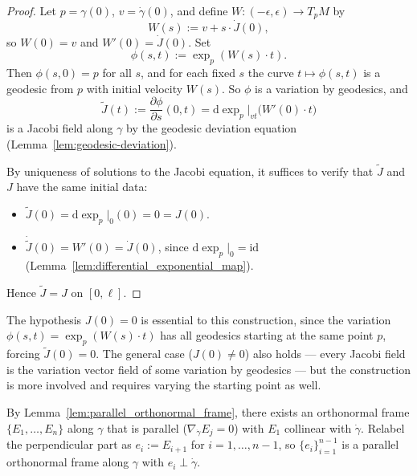 \begin{proof}
Let $p = \gamma(0)$, $v = \dot\gamma(0)$, and define $W : (-\epsilon, \epsilon) \to T_p M$ by
\[
W(s) := v + s \cdot \dot J(0),
\]
so $W(0) = v$ and $W'(0) = \dot J(0)$. Set
\[
\phi(s, t) := \exp_p(W(s) \cdot t).
\]
Then $\phi(s, 0) = p$ for all $s$, and for each fixed $s$ the curve $t \mapsto \phi(s, t)$ is a geodesic from $p$ with initial velocity $W(s)$. So $\phi$ is a variation by geodesics, and 
\[
\widetilde J(t) := \frac{\partial \phi}{\partial s}(0, t) = \mathrm{d}\exp_p\big|_{vt}\big(W'(0) \cdot t\big)
\]
is a Jacobi field along $\gamma$ by the geodesic deviation equation (Lemma~\ref{lem:geodesic-deviation}).

By uniqueness of solutions to the Jacobi equation, it suffices to verify that $\widetilde J$ and $J$ have the same initial data:
\begin{itemize}
    \item $\widetilde J(0) = \mathrm{d}\exp_p\big|_0(0) = 0 = J(0)$.
    \item $\dot{\widetilde J}(0) = W'(0) = \dot J(0)$, since $\mathrm{d}\exp_p\big|_0 = \mathrm{id}$ (Lemma~\ref{lem:differential_exponential_map}).
\end{itemize}
Hence $\widetilde J = J$ on $[0, \ell]$. \qedhere
\end{proof}


\begin{colremark}{}{}
The hypothesis $J(0) = 0$ is essential to this construction, since the variation $\phi(s, t) = \exp_p(W(s) \cdot t)$ has all geodesics starting at the same point $p$, forcing $\widetilde J(0) = 0$. The general case ($J(0) \neq 0$) also holds — every Jacobi field is the variation vector field of some variation by geodesics — but the construction is more involved and requires varying the starting point as well.
\end{colremark}





By Lemma~\ref{lem:parallel_orthonormal_frame}, there exists an orthonormal frame $\{E_1, \ldots, E_n\}$ along $\gamma$ that is parallel ($\nabla_{\dot\gamma} E_j = 0$) with $E_1$ collinear with $\dot\gamma$. Relabel the perpendicular part as $e_i := E_{i+1}$ for $i = 1, \ldots, n-1$, so $\{e_i\}_{i=1}^{n-1}$ is a parallel orthonormal frame along $\gamma$ with $e_i \perp \dot\gamma$.

